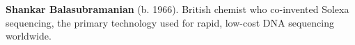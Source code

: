 \textbf{Shankar Balasubramanian} (b. 1966). British chemist who co-invented Solexa sequencing, the primary technology used for rapid, low-cost DNA sequencing worldwide.

